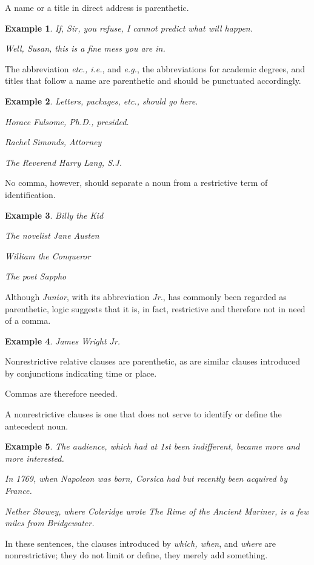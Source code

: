 \documentclass{book}
\numberwithin{equation}{section}
\newtheorem{example}{Example}[chapter]
\begin{document}
%
A name or a title in direct address is parenthetic.
\begin{example}
    If, Sir, you refuse, I cannot predict what will happen.
    
    Well, Susan, this is a fine mess you are in.
\end{example}
The abbreviation \textit{etc., i.e.}, and \textit{e.g.}, the abbreviations for academic degrees, and titles that follow a name are parenthetic and should be punctuated accordingly.
\begin{example}
    Letters, packages, etc., should go here.
    
    Horace Fulsome, Ph.D., presided.
    
    Rachel Simonds, Attorney
    
    The Reverend Harry Lang, S.J.
\end{example}
No comma, however, should separate a noun from a restrictive term of identification.
\begin{example}
    Billy the Kid
    
    The novelist Jane Austen
    
    William the Conqueror
    
    The poet Sappho
\end{example}
Although \textit{Junior}, with its abbreviation \textit{Jr.}, has commonly been regarded as parenthetic, logic suggests that it is, in fact, restrictive and therefore not in need of a comma.
\begin{example}
    James Wright Jr.
\end{example}
Nonrestrictive relative clauses are parenthetic, as are similar clauses introduced by conjunctions indicating time or place.

Commas are therefore needed.

A nonrestrictive clauses is one that does not serve to identify or define the antecedent noun.
\begin{example}
    The audience, which had at 1st been indifferent, became more and more interested.
    
    In 1769, when Napoleon was born, Corsica had but recently been acquired by France.
    
    Nether Stowey, where Coleridge wrote The Rime of the Ancient Mariner, is a few miles from Bridgewater.
\end{example}
In these sentences, the clauses introduced by \textit{which, when}, and \textit{where} are nonrestrictive; they do not limit or define, they merely add something.
\end{document}
